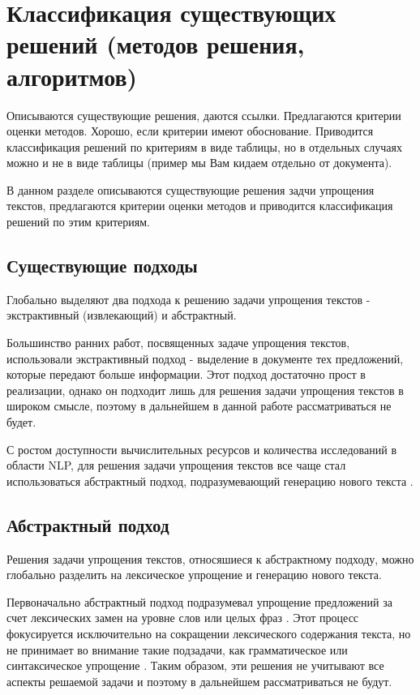 \chapter{Классификация существующих решений (методов решения, алгоритмов)}

Описываются существующие решения, даются ссылки. Предлагаются критерии оценки методов. Хорошо, если критерии имеют обоснование. Приводится классификация решений по критериям в виде таблицы, но в отдельных случаях можно и не в виде таблицы (пример мы Вам кидаем отдельно от документа).

В данном разделе описываются существующие решения задчи упрощения текстов, предлагаются критерии оценки методов и приводится классификация решений по этим критериям.

\section{Существующие подходы}

Глобально выделяют два подхода к решению задачи упрощения текстов - экстрактивный (извлекающий) и абстрактный.

Большинство ранних работ, посвященных задаче упрощения текстов, использовали экстрактивный подход - выделение в документе тех предложений, которые передают больше информации. Этот подход достаточно прост в реализации, однако он подходит лишь для решения задачи упрощения текстов в широком смысле, поэтому в дальнейшем в данной работе рассматриваться не будет.

С ростом доступности вычислительных ресурсов и количества исследований в области NLP, для решения задачи упрощения текстов все чаще стал использоваться абстрактный подход, подразумевающий генерацию нового текста \cite{see_get_2017}. 

\section{Абстрактный подход}

Решения задачи упрощения текстов, относяшиеся к абстрактному подходу, можно глобально разделить на лексическое упрощение и генерацию нового текста.

Первоначально абстрактный подход подразумевал упрощение предложений за счет лексических замен на уровне слов или целых фраз \cite{paetzold_survey_2017}. Этот процесс фокусируется исключительно на сокращении лексического содержания текста, но не принимает во внимание такие подзадачи, как грамматическое или синтаксическое упрощение \cite{shardlow_survey_2014}. Таким образом, эти решения не учитывают все аспекты решаемой задачи и поэтому в дальнейшем рассматриваться не будут.


